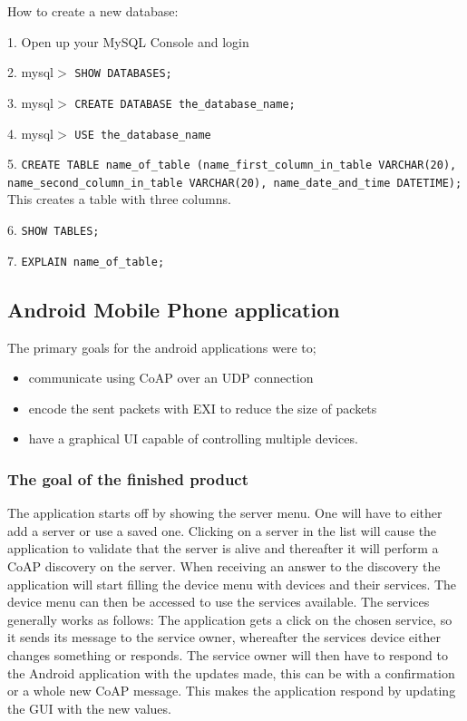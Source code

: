 How to create a new database:

1. 	Open up your MySQL Console and login

2. 	mysql$>$ \texttt{SHOW DATABASES;}

3. 	mysql$>$ \texttt{CREATE DATABASE the_database_name;}

4. 	mysql$>$ \texttt{USE the_database_name}

5. 	\texttt{CREATE TABLE name_of_table (name_first_column_in_table VARCHAR(20), name_second_column_in_table VARCHAR(20), name_date_and_time DATETIME);}
	This creates a table with three columns.
	
6. 	\texttt{SHOW TABLES;}

7. 	\texttt{EXPLAIN name_of_table;}

\subsection{Android Mobile Phone application}

The primary goals for the android applications were to;
\begin{itemize}
 \item communicate using CoAP over an UDP connection
 \item encode the sent packets with EXI to reduce the size of packets
 \item have a graphical UI capable of controlling multiple devices.
\end{itemize}

\subsubsection{The goal of the finished product}

The application starts off by showing the server menu. One will have to either add a server or use a saved one. 
Clicking on a server in the list will cause the application to validate that the server is alive and thereafter it will perform a CoAP discovery on the server. 
When receiving an answer to the discovery the application will start filling the device menu with devices and their services. The device menu can then be accessed to use the services available.
The services generally works as follows: The application gets a click on the chosen service, so it sends its message to the service owner, whereafter the services device either changes something or responds.
The service owner will then have to respond to the Android application with the updates made, this can be with a confirmation or a whole new CoAP message. This makes the application respond by updating the GUI with the new values.\smallskip

